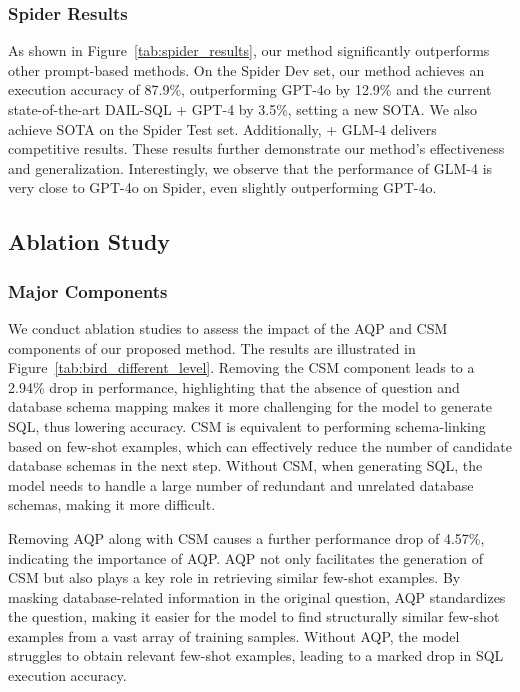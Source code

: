 

\subsubsection{Spider Results}

As shown in Figure~\ref{tab:spider_results}, our method significantly outperforms other prompt-based methods.
On the Spider Dev set, our method achieves an execution accuracy of 87.9\%, outperforming GPT-4o by 12.9\% and the current state-of-the-art DAIL-SQL + GPT-4 by 3.5\%, setting a new SOTA. We also achieve SOTA on the Spider Test set. 
Additionally, \method+ GLM-4 delivers competitive results.
These results further demonstrate our method's effectiveness and generalization. 
Interestingly, we observe that the performance of GLM-4 is very close to GPT-4o on Spider, even slightly outperforming GPT-4o. 





\subsection{Ablation Study}
\subsubsection{Major Components}

We conduct ablation studies to assess the impact of the AQP and CSM components of our proposed method. The results are illustrated in Figure~\ref{tab:bird_different_level}. 
Removing the CSM component leads to a 2.94\% drop in performance, highlighting that the absence of question and database schema mapping makes it more challenging for the model to generate SQL, thus lowering accuracy.
CSM is equivalent to performing schema-linking based on few-shot examples, which can effectively reduce the number of candidate database schemas in the next step.
Without CSM, when generating SQL, the model needs to handle a large number of redundant and unrelated database schemas, making it more difficult.

Removing AQP along with CSM causes a further performance drop of 4.57\%, indicating the importance of AQP. 
AQP not only facilitates the generation of CSM but also plays a key role in retrieving similar few-shot examples. 
By masking database-related information in the original question, AQP standardizes the question, making it easier for the model to find structurally similar few-shot examples from a vast array of training samples. 
Without AQP, the model struggles to obtain relevant few-shot examples, leading to a marked drop in SQL execution accuracy.

